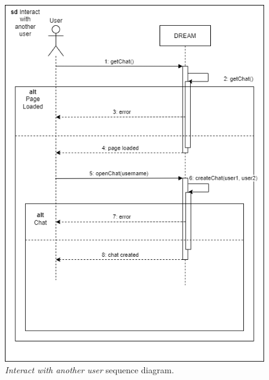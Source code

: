 \begin{figure}[H]
    \centering
    \includegraphics[width=\linewidth]{Images/Use Case/UC2.png}
    \caption{\textit{Interact with another user} sequence diagram.}
\end{figure}
\newpage

